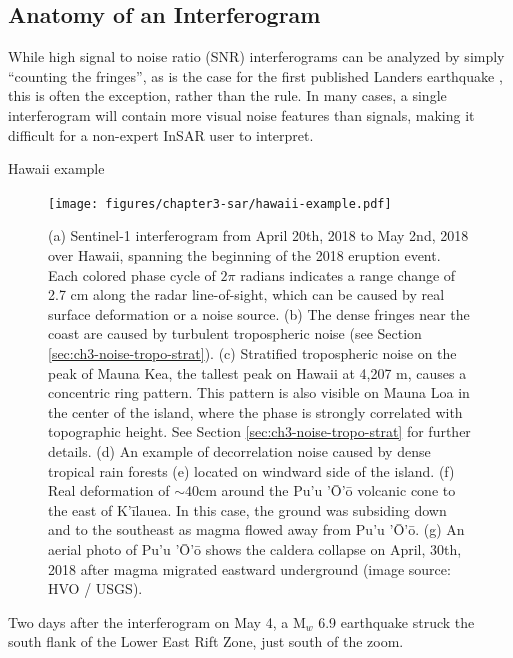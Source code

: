 \subsection{Anatomy of an Interferogram}

While high signal to noise ratio (SNR) interferograms can be analyzed by simply ``counting the fringes'', as is the case for the first published Landers earthquake \cite{Massonnet1993DisplacementFieldLanders}, this is often the exception, rather than the rule.
In many cases, a single interferogram will contain more visual noise features than signals, making it difficult for a non-expert InSAR user to interpret. 

Hawaii example




\begin{figure}[!htbp]
	\centering
	\texttt{[image: figures/chapter3-sar/hawaii-example.pdf]}
	\caption[Sentinel-1 interferogram over Hawaii showing common noise sources, along with 2018 eruption deformation]{
		(a) Sentinel-1 interferogram from April 20th, 2018 to May 2nd, 2018 over Hawaii, spanning the beginning of the 2018 eruption event.
		Each colored phase cycle of $2\pi$ radians indicates a range change of 2.7 cm along the radar line-of-sight, which can be caused by real surface deformation or a noise source.
		(b) The dense fringes near the coast are caused by turbulent tropospheric noise (see Section \ref{sec:ch3-noise-tropo-strat}).
		(c) Stratified tropospheric noise on the peak of Mauna Kea, the tallest peak on Hawaii at 4,207 m, causes a concentric ring pattern. This pattern is also visible on Mauna Loa in the center of the island, where the phase is strongly correlated with topographic height. See Section \ref{sec:ch3-noise-tropo-strat} for further details.
		(d) An example of decorrelation noise caused by dense tropical rain forests (e) located on windward side of the island.
		(f) Real deformation of $ \sim 40 $cm around the Pu'u '\=O'\=o volcanic cone to the east of K'\=ilauea. In this case, the ground was subsiding down and to the southeast as magma flowed away from Pu'u '\=O'\=o.
		(g) An aerial photo of Pu'u '\=O'\=o shows the caldera collapse on April, 30th, 2018 after magma migrated eastward underground (image source: HVO / USGS).
	}
	\label{fig:sar-hawaii-example}
\end{figure}

Two days after the interferogram on May 4, a  M$_w$ 6.9 earthquake struck the south flank of the Lower East Rift Zone, just south of the zoom.



